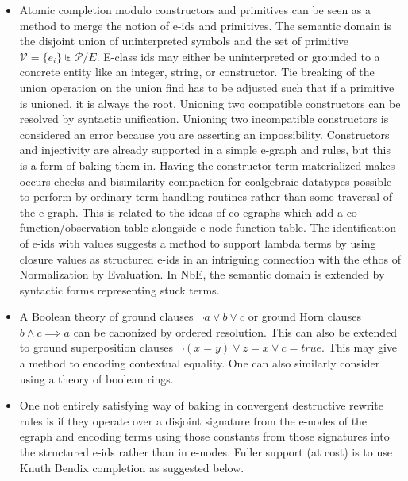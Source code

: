 \documentclass[sigconf]{acmart}
\begin{document}
\begin{itemize}
\item Atomic completion modulo constructors and primitives can be seen as a method to merge the notion of e-ids and primitives. The semantic domain is the disjoint union of uninterpreted symbols and the set of primitive $ \mathcal{V} = \{ e_i \}  \uplus \mathcal{P} / E$. E-class ids may either be uninterpreted or grounded to a concrete entity like an integer, string, or constructor. Tie breaking of the union operation on the union find has to be adjusted such that if a primitive is unioned, it is always the root. Unioning two compatible constructors can be resolved by syntactic unification. Unioning two incompatible constructors is considered an error because you are asserting an impossibility. Constructors and injectivity are already supported in a simple e-graph and rules, but this is a form of baking them in. Having the constructor term materialized makes occurs checks and bisimilarity compaction for coalgebraic datatypes possible to perform by ordinary term handling routines rather than some traversal of the e-graph. This is related to the ideas of co-egraphs \cite{coegraph} which add a co-function/observation table alongside e-node function table. The identification of e-ids with values suggests a method to support lambda terms by using closure values as structured e-ids in an intriguing connection with the ethos of Normalization by Evaluation. In NbE, the semantic domain is extended by syntactic forms representing stuck terms.


\item A Boolean theory of ground clauses $ \lnot a \lor b \lor c$ or ground Horn clauses $b \land c \implies a$ can be canonized by ordered resolution. This can also be extended to ground superposition clauses $ \lnot(x = y) \lor z = x \lor c = true$. This may give a method to encoding contextual equality. One can also similarly consider using a theory of boolean rings.  %

\item One not entirely satisfying way of baking in convergent destructive rewrite rules is if they operate over a disjoint signature from the e-nodes of the egraph and encoding terms using those constants from those signatures into the structured e-ids rather than in e-nodes. Fuller support (at cost) is to use Knuth Bendix completion as suggested below.

\end{itemize}
\end{document}

